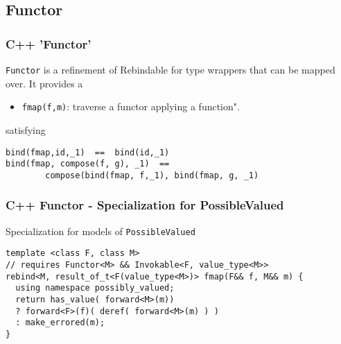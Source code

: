 \documentclass[xcolor=dvipsnames]{beamer}
\newcommand{\cpp}[1]{\lstinline{#1}}
\begin{document}
\subsection{Functor}
\begin{frame}[fragile]
\frametitle{C++ 'Functor'}

\cpp{Functor} is a refinement of Rebindable for type wrappers that can be mapped over.  It provides a

\begin{itemize}
  \item \cpp{fmap(f,m)}: traverse a functor applying a function".
\end{itemize}
        
satisfying

\begin{lstlisting}
bind(fmap,id,_1)  ==  bind(id,_1)
bind(fmap, compose(f, g), _1)  ==  
        compose(bind(fmap, f,_1), bind(fmap, g, _1)
\end{lstlisting}

\end{frame}
\begin{frame}[fragile]
\frametitle{C++ Functor - Specialization for PossibleValued}
       
Specialization for models of \cpp{PossibleValued}       

\begin{lstlisting}
template <class F, class M>
// requires Functor<M> && Invokable<F, value_type<M>>
rebind<M, result_of_t<F(value_type<M>)> fmap(F&& f, M&& m) {
  using namespace possibly_valued;
  return has_value( forward<M>(m))
  ? forward<F>(f)( deref( forward<M>(m) ) )
  : make_errored(m);
}
\end{lstlisting}
         
\end{frame}
\end{document}
